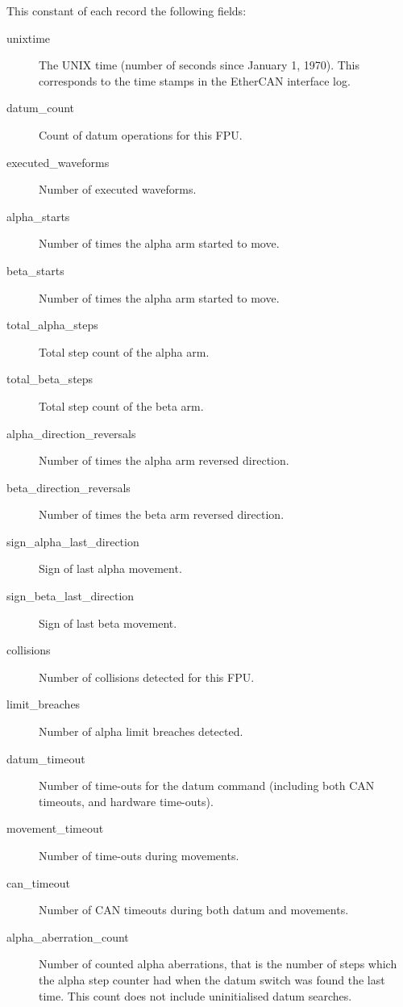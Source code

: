 \documentclass[fontsize=12,a4paper]{scrreprt}
\begin{document}
This constant of each record the following fields:

\begin{description}

\item[unixtime] The UNIX time (number of seconds since January 1,
  1970). This corresponds to the time stamps in the EtherCAN interface log.

\item[datum\_count] Count of datum operations for this FPU.

  \item[executed\_waveforms] Number of executed waveforms.

  \item[alpha\_starts] Number of times the alpha arm started to move.
  \item[beta\_starts] Number of times the alpha arm started to move.
  \item[total\_alpha\_steps] Total step count of the alpha arm.
  \item[total\_beta\_steps] Total step count of the beta arm.

  \item[alpha\_direction\_reversals] Number of times the alpha arm reversed direction.
  \item[beta\_direction\_reversals]  Number of times the beta arm reversed direction.
  \item[sign\_alpha\_last\_direction] Sign of last alpha movement.
  \item[sign\_beta\_last\_direction] Sign of last beta movement.


  \item[collisions] Number of collisions detected for this FPU.
  \item[limit\_breaches] Number of alpha limit breaches detected.
  \item[datum\_timeout] Number of time-outs for the datum command (including both CAN timeouts, and hardware time-outs).
  \item[movement\_timeout] Number of time-outs during movements.
  \item[can\_timeout] Number of CAN timeouts during both datum and movements.

  \item[alpha\_aberration\_count] Number of counted alpha aberrations,
    that is the number of steps which the alpha step counter had when
    the datum switch was found the last time. This count does not include
    uninitialised datum searches.


\end{description}
\end{document}
